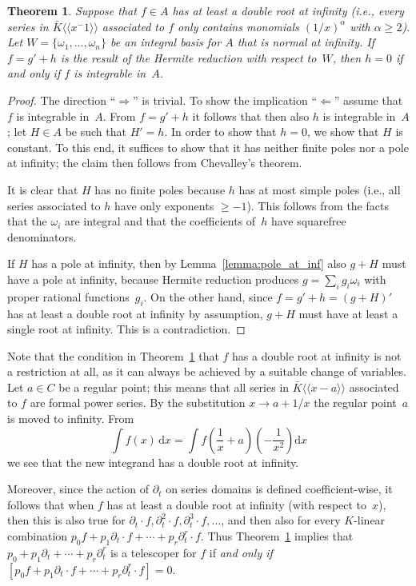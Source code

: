 \documentclass{sig-alternate}
\newtheorem{theorem}{Theorem}
\def\<#1>{\langle\!\langle#1\rangle\!\rangle} %
\begin{document}
\begin{theorem}\label{thm:intiff0}
  Suppose that $f\in A$
  has at least a double root at infinity (i.e., every series in $\bar K\<x^{-1}>$
  associated to $f$ only contains monomials $(1/x)^\alpha$ with $\alpha\geq2$).
  Let $W=\{\omega_1,\dots,\omega_n\}$
  be an integral basis for $A$ that is normal at infinity.
  If $f=g'+h$ is the result of the Hermite reduction with respect to~$W$,
  then $h=0$ if and only if $f$ is integrable in~$A$.
\end{theorem}

\begin{proof}
The direction ``$\Rightarrow$'' is trivial. To show the implication
``$\Leftarrow$'' assume that $f$ is integrable in~$A$. From $f=g'+h$ it follows that
then also $h$ is integrable in~$A$; let $H\in A$ be such that $H'=h$.  In order to show
that $h=0$, we show that $H$ is constant.  To this end, it suffices to show that
it has neither finite poles nor a pole at infinity; the claim then follows from
Chevalley's theorem.

It is clear that $H$ has no finite poles because $h$ has at most simple poles
(i.e., all series associated to $h$ have only exponents $\geq-1$).
This follows from the facts that the $\omega_i$ are integral and that
the coefficients of~$h$ have squarefree denominators.

If $H$ has a pole at infinity, then by Lemma~\ref{lemma:pole_at_inf} also
$g+H$ must have a pole at infinity, because Hermite reduction produces
$g=\sum_i g_i\omega_i$ with proper rational functions~$g_i$.  On the other
hand, since $f=g'+h=(g+H)'$ has at least a double root at infinity by
assumption, $g+H$ must have at least a single root at infinity. This is
a contradiction.
\end{proof}

Note that the condition in Theorem~\ref{thm:intiff0} that $f$ has a double
root at infinity is not a restriction at all, as it can always be achieved by
a suitable change of variables. Let $a\in C$ be a regular point; this means
that all series in $\bar K\<x-a>$ associated to $f$ are formal power series. By the substitution
$x\to a+1/x$ the regular point~$a$ is moved to infinity. From
\[
  \int f(x) \,\mathrm{d}x = \int f\left(\frac{1}{x}+a\right)\left(-\frac{1}{x^2}\right) \mathrm{d}x
\]
we see that the new integrand has a double root at infinity.

Moreover, since the action of $\partial_t$ on series domains is defined coefficient-wise,
it follows that when $f$ has at least a double root at infinity (with respect to~$x$),
then this is also true for $\partial_t\cdot f, \partial_t^2\cdot f, \partial_t^3\cdot f,\dots$,
and then also for every $K$-linear combination $p_0f+p_1\partial_t\cdot f+\cdots+p_r\partial_t^r\cdot f$.
Thus Theorem~\ref{thm:intiff0} implies that $p_0+p_1\partial_t+\cdots+p_r\partial_t^r$ is a telescoper for $f$ if
\emph{and only if} $[p_0f+p_1\partial_t\cdot f+\cdots+p_r\partial_t^r\cdot f]=0$.
\end{document}

